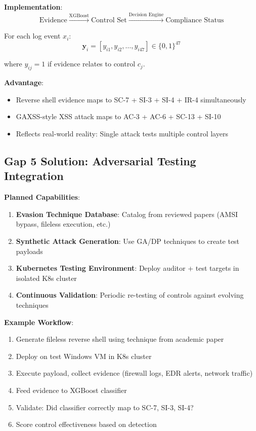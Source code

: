 \documentclass[11pt,conference]{IEEEtran}
\begin{document}
\textbf{Implementation}:
\begin{equation}
\text{Evidence} \xrightarrow{\text{XGBoost}} \text{Control Set} \xrightarrow{\text{Decision Engine}} \text{Compliance Status}
\end{equation}

For each log event $x_i$:
\begin{equation}
\mathbf{y}_i = [y_{i1}, y_{i2}, \ldots, y_{i47}] \in \{0,1\}^{47}
\end{equation}

where $y_{ij} = 1$ if evidence relates to control $c_j$.

\textbf{Advantage}:
\begin{itemize}
    \item Reverse shell evidence maps to SC-7 + SI-3 + SI-4 + IR-4 simultaneously
    \item GAXSS-style XSS attack maps to AC-3 + AC-6 + SC-13 + SI-10
    \item Reflects real-world reality: Single attack tests multiple control layers
\end{itemize}

\subsection{Gap 5 Solution: Adversarial Testing Integration}

\textbf{Planned Capabilities}:
\begin{enumerate}
    \item \textbf{Evasion Technique Database}: Catalog from reviewed papers (AMSI bypass, fileless execution, etc.)
    \item \textbf{Synthetic Attack Generation}: Use GA/DP techniques to create test payloads
    \item \textbf{Kubernetes Testing Environment}: Deploy auditor + test targets in isolated K8s cluster
    \item \textbf{Continuous Validation}: Periodic re-testing of controls against evolving techniques
\end{enumerate}

\textbf{Example Workflow}:
\begin{enumerate}
    \item Generate fileless reverse shell using technique from academic paper
    \item Deploy on test Windows VM in K8s cluster
    \item Execute payload, collect evidence (firewall logs, EDR alerts, network traffic)
    \item Feed evidence to XGBoost classifier
    \item Validate: Did classifier correctly map to SC-7, SI-3, SI-4?
    \item Score control effectiveness based on detection
\end{enumerate}
\end{document}
